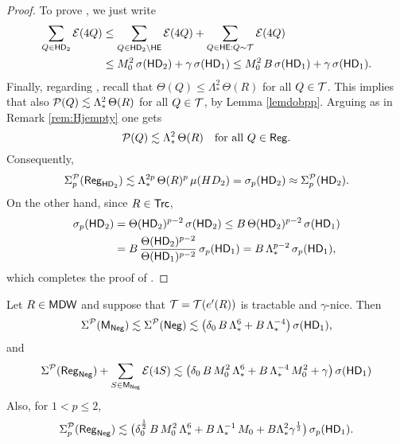 \begin{proof}
To prove , we just write
\begin{align*}
 \sum_{Q\in{\mathsf{HD}}_2} {\mathcal E}(4Q) &\leq  \sum_{Q\in{\mathsf{HD}}_2\setminus {\mathsf {HE}}} {\mathcal E}(4Q) +  \sum_{Q\in {\mathsf {HE}}:Q\sim{\mathcal T}} {\mathcal E}(4Q)\\
&\leq M_0^2\,\sigma({\mathsf{HD}}_2) + \gamma\,\sigma({\mathsf{HD}}_1)\leq M_0^2\,B\,\sigma({\mathsf{HD}}_1) + \gamma\,\sigma({\mathsf{HD}}_1).
\end{align*}
Finally, regarding
 , recall that $\Theta(Q) \leq\Lambda_*^2\,\Theta(R)$ for all $Q\in{\mathcal T}$.
This implies that also ${\mathcal P}(Q) \lesssim\Lambda_*^2\,\Theta(R)$ for all $Q\in{\mathcal T}$, by Lemma \ref{lemdobpp}. Arguing as in Remark \ref{rem:Hjempty} one gets
\begin{equation}\label{eq:Regdens}
{\mathcal P}(Q) \lesssim\Lambda_*^2\,\Theta(R)\quad \text{for all $Q\in{\mathsf{Reg}}$.}
\end{equation}
Consequently,
$$\Sigma_p^{\mathcal P}({\mathsf{Reg}}_{{\mathsf{HD}}_2})\lesssim \Lambda_*^{2p}\,\Theta(R)^p\,\mu(HD_2) = \sigma_p({\mathsf{HD}}_2) \approx
\Sigma_p^{\mathcal P}({\mathsf{HD}}_2).$$
On the other hand, since $R\in{\mathsf{Trc}}$,
\begin{align*}
\sigma_p({\mathsf{HD}}_2) & = \Theta({\mathsf{HD}}_2)^{p-2}\,\sigma({\mathsf{HD}}_2)\leq B\,\Theta({\mathsf{HD}}_2)^{p-2}\,\sigma({\mathsf{HD}}_1)
\\ &= B\,\frac{\Theta({\mathsf{HD}}_2)^{p-2}}{\Theta({\mathsf{HD}}_1)^{p-2}}\,\sigma_p({\mathsf{HD}}_1) = B\,\Lambda_*^{p-2}\,\sigma_p({\mathsf{HD}}_1),
 \end{align*}
 which completes the proof of .
\end{proof}

\vv



\begin{lemma}\label{lemneg3}
Let $R\in{\mathsf{MDW}}$ and suppose that ${\mathcal T}={\mathcal T}(e'(R))$ is tractable and $\gamma$-nice.
 Then
\begin{equation}\label{eqlemneg01}
\Sigma^{\mathcal P}({\mathsf{M}}_{\mathsf{Neg}})\lesssim\Sigma^{\mathcal P}({\mathsf{Neg}}) \lesssim \big(\delta_0\,B\,\Lambda_*^6 + B\,\Lambda_*^{-4}\big)\,\sigma({\mathsf{HD}}_1),
\end{equation}
and
\begin{equation}\label{eqlemneg02}
\Sigma^{\mathcal P}({\mathsf{Reg}}_{\mathsf{Neg}}) + \sum_{S\in{\mathsf{M}}_{\mathsf{Neg}}} {\mathcal E}(4S)\lesssim \big(\delta_0\,B\,M_0^2\,\Lambda_*^6 + B\,\Lambda_*^{-4}\,M_0^2+ \gamma\big)\,\sigma({\mathsf{HD}}_1)
\end{equation}
Also, for $1<p\leq 2$,
\begin{equation}\label{eqlemneg03}
\Sigma_p^{\mathcal P}({\mathsf{Reg}}_{\mathsf{Neg}}) \lesssim \big(\delta_0^{\frac12}\,B\,M_0^2\,\Lambda_*^6 + B\,\Lambda_*^{-1}\,M_0+ B\Lambda_*^2\gamma^{\frac12}\big)
\,\sigma_p({\mathsf{HD}}_1).
\end{equation}
\end{lemma}

